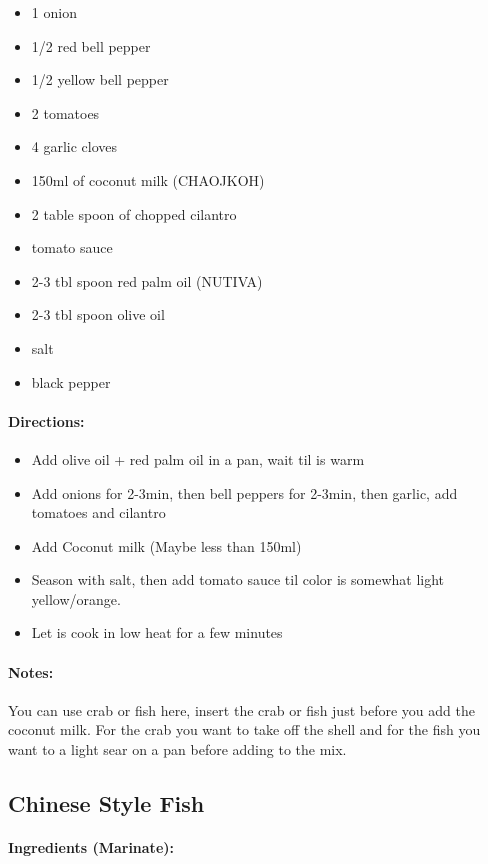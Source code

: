 \documentclass{article}
\begin{document}
\begin{itemize}
	\item 1 onion	
	\item 1/2 red bell pepper 
	\item 1/2 yellow bell pepper 
	\item 2 tomatoes
	\item 4 garlic cloves
	\item 150ml of coconut milk (CHAOJKOH)
	\item 2 table spoon of chopped cilantro
	\item tomato sauce
	\item 2-3 tbl spoon red palm oil (NUTIVA)
	\item 2-3 tbl spoon olive oil
	\item salt
	\item black pepper
\end{itemize}

\paragraph{Directions:}
\begin{itemize}
	\item Add olive oil + red palm oil in a pan, wait til is warm
	\item Add onions for 2-3min, then bell peppers for 2-3min, then garlic, add tomatoes and cilantro
	\item Add Coconut milk (Maybe less than 150ml)
	\item Season with salt, then add tomato sauce til color is somewhat light yellow/orange.
	\item Let is cook in low heat for a few minutes
\end{itemize}

\paragraph{Notes:} You can use crab or fish here, insert the crab or fish just before you add the coconut milk. For the crab you want to take off the shell and for the fish you want to a light sear on a pan before adding to the mix.

\subsection{Chinese Style Fish}

\paragraph{Ingredients (Marinate):}
\end{document}
